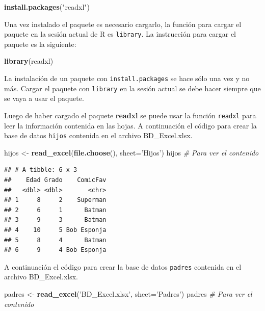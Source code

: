 \documentclass[10pt,]{krantz}
\makeatletter
\newenvironment{Shaded}{\begin{snugshade}}{\end{snugshade}}
\newcommand{\KeywordTok}[1]{\textcolor[rgb]{0.13,0.29,0.53}{\textbf{{#1}}}}
\newcommand{\DataTypeTok}[1]{\textcolor[rgb]{0.13,0.29,0.53}{{#1}}}
\newcommand{\StringTok}[1]{\textcolor[rgb]{0.31,0.60,0.02}{{#1}}}
\newcommand{\CommentTok}[1]{\textcolor[rgb]{0.56,0.35,0.01}{\textit{{#1}}}}
\newcommand{\NormalTok}[1]{{#1}}
\let\proglang=\textsf
\newenvironment{kframe}{%
\medskip{}
\setlength{\fboxsep}{.8em}
 \def\at@end@of@kframe{}%
 \ifinner\ifhmode%
  \def\at@end@of@kframe{\end{minipage}}%
  \begin{minipage}{\columnwidth}%
 \fi\fi%
 \def\FrameCommand##1{\hskip\@totalleftmargin \hskip-\fboxsep
 \colorbox{shadecolor}{##1}\hskip-\fboxsep
     \hskip-\linewidth \hskip-\@totalleftmargin \hskip\columnwidth}%
 \MakeFramed {\advance\hsize-\width
   \@totalleftmargin\z@ \linewidth\hsize
   \@setminipage}}%
 {\par\unskip\endMakeFramed%
 \at@end@of@kframe}
\renewenvironment{Shaded}{\begin{kframe}}{\end{kframe}}
\let\BeginKnitrBlock\begin \let\EndKnitrBlock\end
\makeatother
\begin{document}
\begin{Shaded}
\begin{Highlighting}[]
\KeywordTok{install.packages}\NormalTok{(}\StringTok{"readxl"}\NormalTok{)}
\end{Highlighting}
\end{Shaded}

Una vez instalado el paquete es necesario cargarlo, la función para
cargar el paquete en la sesión actual de \proglang{R} es
\texttt{library}. La instrucción para cargar el paquete es la siguiente:

\begin{Shaded}
\begin{Highlighting}[]
\KeywordTok{library}\NormalTok{(readxl)}
\end{Highlighting}
\end{Shaded}

\BeginKnitrBlock{rmdwarning}
La instalación de un paquete con \texttt{install.packages} se hace sólo
una vez y no más. Cargar el paquete con \texttt{library} en la sesión
actual se debe hacer siempre que se vaya a usar el paquete.
\EndKnitrBlock{rmdwarning}

Luego de haber cargado el paquete \textbf{readxl} se puede usar la
función \texttt{readxl} para leer la información contenida en las hojas.
A continuación el código para crear la base de datos \texttt{hijos}
contenida en el archivo BD\_Excel.xlsx.

\begin{Shaded}
\begin{Highlighting}[]
\NormalTok{hijos <-}\StringTok{ }\KeywordTok{read_excel}\NormalTok{(}\KeywordTok{file.choose}\NormalTok{(), }\DataTypeTok{sheet=}\StringTok{'Hijos'}\NormalTok{)}
\NormalTok{hijos  }\CommentTok{# Para ver el contenido}
\end{Highlighting}
\end{Shaded}

\begin{verbatim}
## # A tibble: 6 x 3
##    Edad Grado    ComicFav
##   <dbl> <dbl>       <chr>
## 1     8     2    Superman
## 2     6     1      Batman
## 3     9     3      Batman
## 4    10     5 Bob Esponja
## 5     8     4      Batman
## 6     9     4 Bob Esponja
\end{verbatim}

A continuación el código para crear la base de datos \texttt{padres}
contenida en el archivo BD\_Excel.xlsx.

\begin{Shaded}
\begin{Highlighting}[]
\NormalTok{padres <-}\StringTok{ }\KeywordTok{read_excel}\NormalTok{(}\StringTok{'BD_Excel.xlsx'}\NormalTok{, }\DataTypeTok{sheet=}\StringTok{'Padres'}\NormalTok{)}
\NormalTok{padres  }\CommentTok{# Para ver el contenido}
\end{Highlighting}
\end{Shaded}
\end{document}
